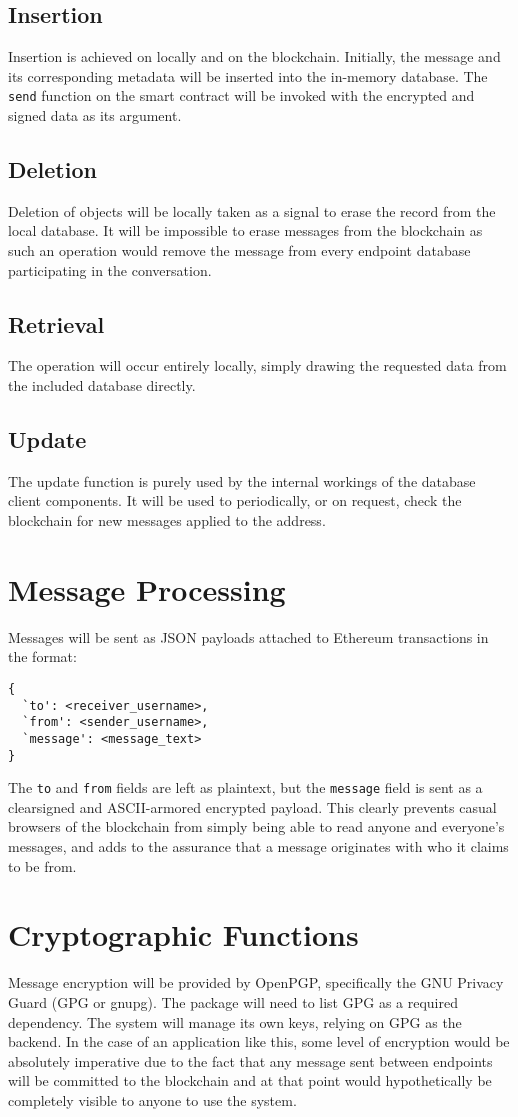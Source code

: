 \documentclass[]{article}
\begin{document}
\subsection{Insertion}
Insertion is achieved on locally and on the blockchain. Initially, the message and its corresponding metadata will be inserted into the in-memory database. The \verb!send! function on the smart contract will be invoked with the encrypted and signed data as its argument. 
\subsection{Deletion}
Deletion of objects will be locally taken as a signal to erase the record from the local database. It will be impossible to erase messages from the blockchain as such an operation would remove the message from every endpoint database participating in the conversation.
\subsection{Retrieval}
The operation will occur entirely locally, simply drawing the requested data from the included database directly.
\subsection{Update}
The update function is purely used by the internal workings of the database client components. It will be used to periodically, or on request, check the blockchain for new messages applied to the address.

\section{Message Processing}
Messages will be sent as JSON payloads attached to Ethereum transactions in the format:
\begin{verbatim}
{
  `to': <receiver_username>,
  `from': <sender_username>,
  `message': <message_text>
}
\end{verbatim}
The \verb!to! and \verb!from! fields are left as plaintext, but the \verb!message! field is sent as a clearsigned and ASCII-armored encrypted payload. This clearly prevents casual browsers of the blockchain from simply being able to read anyone and everyone's messages, and adds to the assurance that a message originates with who it claims to be from.

\section{Cryptographic Functions}
Message encryption will be provided by OpenPGP, specifically the GNU Privacy Guard (GPG or gnupg). The package will need to list GPG as a required dependency. The system will manage its own keys, relying on GPG as the backend. In the case of an application like this, some level of encryption would be absolutely imperative due to the fact that any message sent between endpoints will be committed to the blockchain and at that point would hypothetically be completely visible to anyone to use the system.
\end{document}

